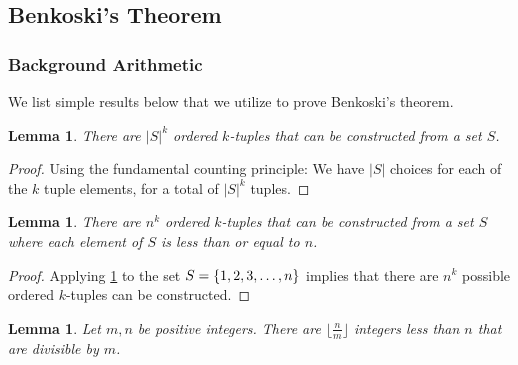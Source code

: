 \documentclass[10pt,a4paper]{article}
\newtheorem{lemma}[theorem]{Lemma}
\theoremstyle{definition}
\theoremstyle{remark}
\begin{document}
\subsection{Benkoski's Theorem}

\subsubsection{Background Arithmetic}
We list simple results below that we utilize to prove Benkoski's theorem. 
\begin{lemma}\label{ordered-k-tuples}
	 There are \(|S|^k\) ordered \(k\)-tuples that can be constructed from a set \(S\).
\end{lemma}
\begin{proof}
	Using the fundamental counting principle: We have \(|S|\) choices for each of the \(k\) tuple elements, for a total of \(|S|^k\) tuples. 
\end{proof}

\begin{lemma}
	There are \(n^k\) ordered \(k\)-tuples that can be constructed from a set \(S\) where each element of \(S\) is less than or equal to \(n\).
\end{lemma}
\begin{proof}
	Applying \cref{ordered-k-tuples} to the set $S=\{1,2,3,\mathellipsis,n\}$ implies that there are $n^k$ possible ordered $k$-tuples can be constructed.
\end{proof}

\begin{lemma}\label{less-than-n-divisible-by-m}
	Let \(m,n\) be positive integers. There are \(\lfloor\frac{n}{m}\rfloor\) integers less than \(n\) that are divisible by \(m\).
\end{lemma}
\end{document}
